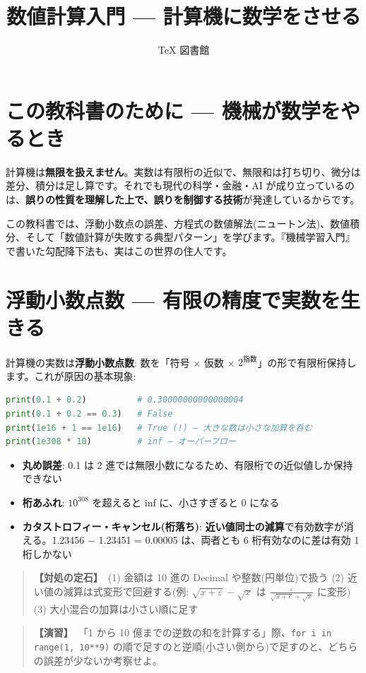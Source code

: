 \documentclass{article}
\title{数値計算入門 — 計算機に数学をさせる}
\author{TeX 図書館}
\begin{document}
\section{この教科書のために — 機械が数学をやるとき}

計算機は\textbf{無限を扱えません}。実数は有限桁の近似で、無限和は打ち切り、微分は差分、積分は足し算です。それでも現代の科学・金融・AI が成り立っているのは、\textbf{誤りの性質を理解した上で、誤りを制御する技術}が発達しているからです。

この教科書では、浮動小数点の誤差、方程式の数値解法(ニュートン法)、数値積分、そして「数値計算が失敗する典型パターン」を学びます。『機械学習入門』で書いた勾配降下法も、実はこの世界の住人です。

\section{浮動小数点数 — 有限の精度で実数を生きる}

計算機の実数は\textbf{浮動小数点数}: 数を「符号 × 仮数 × \(2^{指数}\)」の形で有限桁保持します。これが原因の基本現象:

\begin{lstlisting}[language=Python]
print(0.1 + 0.2)          # 0.30000000000000004
print(0.1 + 0.2 == 0.3)   # False
print(1e16 + 1 == 1e16)   # True (!) — 大きな数は小さな加算を呑む
print(1e308 * 10)         # inf — オーバーフロー
\end{lstlisting}

\begin{itemize}
\item \textbf{丸め誤差}: 0.1 は 2 進では無限小数になるため、有限桁での近似値しか保持できない
\item \textbf{桁あふれ}: \(10^{308}\) を超えると inf に、小さすぎると 0 になる
\item \textbf{カタストロフィー・キャンセル(桁落ち)}: \textbf{近い値同士の減算}で有効数字が消える。1.23456 − 1.23451 = 0.00005 は、両者とも 6 桁有効なのに差は有効 1 桁しかない
\end{itemize}

\begin{quote}
\textbf{【対処の定石】}\ (1) 金額は 10 進の Decimal や整数(円単位)で扱う (2) 近い値の減算は式変形で回避する(例: \(\sqrt{x+\varepsilon} - \sqrt{x}\) は \(\frac{\varepsilon}{\sqrt{x+\varepsilon}+\sqrt{x}}\) に変形)(3) 大小混合の加算は小さい順に足す
\end{quote}

\begin{quote}
\textbf{【演習】}\ 「1 から 10 億までの逆数の和を計算する」際、\texttt{for i in range(1, 10**9)} の順で足すのと逆順(小さい側から)で足すのと、どちらの誤差が少ないか考察せよ。
\end{quote}
\end{document}
